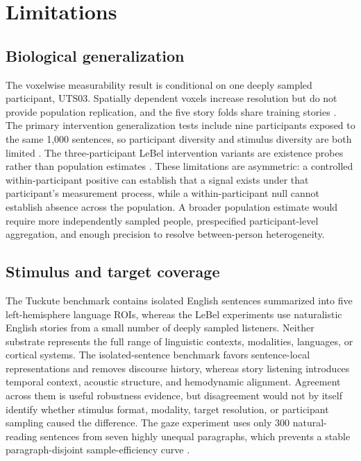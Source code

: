 \section{Limitations}

\subsection{Biological generalization}

The voxelwise measurability result is conditional on one deeply sampled participant, UTS03.
Spatially dependent voxels increase resolution but do not provide population replication, and the five story folds share training stories .
The primary intervention generalization tests include nine participants exposed to the same 1,000 sentences, so participant diversity and stimulus diversity are both limited .
The three-participant LeBel intervention variants are existence probes rather than population estimates   .
These limitations are asymmetric: a controlled within-participant positive can establish that a signal exists under that participant's measurement process, while a within-participant null cannot establish absence across the population.
A broader population estimate would require more independently sampled people, prespecified participant-level aggregation, and enough precision to resolve between-person heterogeneity.

\subsection{Stimulus and target coverage}

The Tuckute benchmark contains isolated English sentences summarized into five left-hemisphere language ROIs, whereas the LeBel experiments use naturalistic English stories from a small number of deeply sampled listeners.
Neither substrate represents the full range of linguistic contexts, modalities, languages, or cortical systems.
The isolated-sentence benchmark favors sentence-local representations and removes discourse history, whereas story listening introduces temporal context, acoustic structure, and hemodynamic alignment.
Agreement across them is useful robustness evidence, but disagreement would not by itself identify whether stimulus format, modality, target resolution, or participant sampling caused the difference.
The gaze experiment uses only 300 natural-reading sentences from seven highly unequal paragraphs, which prevents a stable paragraph-disjoint sample-efficiency curve .

